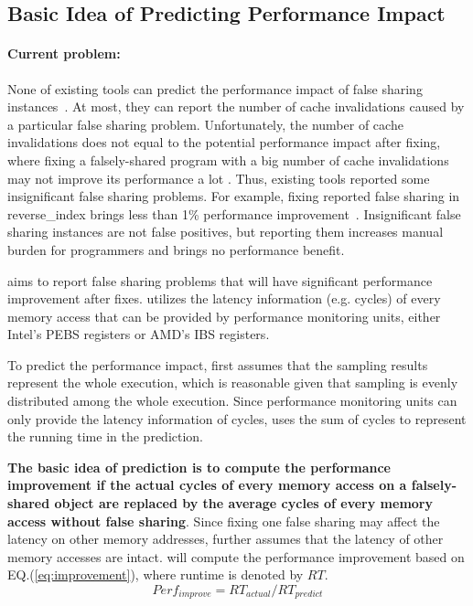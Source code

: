 \subsection{Basic Idea of Predicting Performance Impact}
\label{sec:predictidea}

\paragraph{Current problem:} None of existing tools can predict the performance impact of false sharing instances~\cite{sheriff, Predator, openmp}. At most, they can report the number of cache invalidations caused by a particular false sharing problem. Unfortunately, the number of cache invalidations does not equal to the potential performance impact after fixing, where fixing a falsely-shared program with a big number of cache invalidations may not improve its performance a lot . Thus, existing tools reported some insignificant false sharing problems. For example, fixing reported false sharing in reverse\_index brings less than 1\% performance improvement~\cite{sheriff, Predator}. Insignificant false sharing instances are not false positives, but reporting them increases manual burden for programmers and brings no performance benefit. 

\Cheetah{} aims to report false sharing problems that will have significant performance improvement after fixes. \Cheetah{} utilizes the latency information (e.g. cycles) of every memory access that can be provided by performance monitoring units, either Intel's PEBS registers or AMD's IBS registers. 

To predict the performance impact, \Cheetah{} first assumes that the sampling results represent the whole execution, which is reasonable given that sampling is evenly distributed among the whole execution. Since performance monitoring units can only provide the latency information of cycles, \Cheetah{} uses the sum of cycles to represent the running time in the prediction.  

{\bf The basic idea of prediction is to compute the performance improvement if the actual cycles of every memory access on a
falsely-shared object are replaced by the average cycles of every memory access without false sharing}. Since fixing one false sharing may affect the latency on other memory addresses, \cheetah{} further assumes that the latency of other memory accesses are intact. \cheetah{} will compute the performance improvement based on EQ.(\ref{eq:improvement}), where runtime is denoted by $RT$. 
\begin{equation}
\label{eq:improvement}
Perf_{improve}=RT_{actual}/RT_{predict}
\end{equation} 


